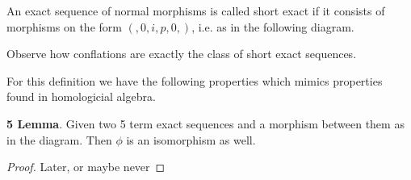     \begin{remark}
        An exact sequence of normal morphisms is called short exact if it consists of morphisms on the form $(,0,i,p,0,)$, i.e. as in the following diagram.

        \begin{center}
        \end{center}

        Observe how conflations are exactly the class of short exact sequences.
    \end{remark}

    For this definition we have the following properties which mimics properties found in homologicial algebra.

    \begin{lemma}
        \textbf{5 Lemma}. Given two 5 term exact sequences and a morphism between them as in the diagram. Then $\phi$ is an isomorphism as well.
        \begin{center}
        \end{center}
    \end{lemma}

    \begin{proof}
        Later, or maybe never
    \end{proof}

